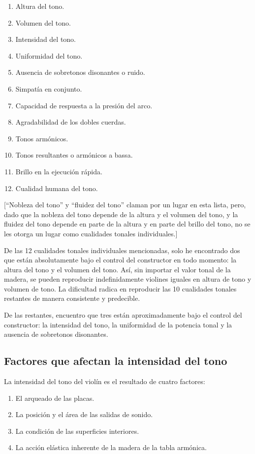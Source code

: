 \documentclass[12pt]{book}
\begin{document}
\begin{enumerate}
    \item Altura del tono.
    \item Volumen del tono.
    \item Intensidad del tono.
    \item Uniformidad del tono.
    \item Ausencia de sobretonos disonantes o ruido.
    \item Simpatía en conjunto.
    \item Capacidad de respuesta a la presión del arco.
    \item Agradabilidad de los dobles cuerdas.
    \item Tonos armónicos.
    \item Tonos resultantes o armónicos a bassa.
    \item Brillo en la ejecución rápida.
    \item Cualidad humana del tono.
\end{enumerate}

[``Nobleza del tono'' y ``fluidez del tono'' claman por un lugar en esta lista, pero, dado que la nobleza del tono depende de la altura y el volumen del tono, y la fluidez del tono depende en parte de la altura y en parte del brillo del tono, no se les otorga un lugar como cualidades tonales individuales.]

De las 12 cualidades tonales individuales mencionadas, solo he encontrado dos que están absolutamente bajo el control del constructor en todo momento: la altura del tono y el volumen del tono. Así, sin importar el valor tonal de la madera, se pueden reproducir indefinidamente violines iguales en altura de tono y volumen de tono. La dificultad radica en reproducir las 10 cualidades tonales restantes de manera consistente y predecible.

De las restantes, encuentro que tres están aproximadamente bajo el control del constructor: la intensidad del tono, la uniformidad de la potencia tonal y la ausencia de sobretonos disonantes.

\subsection*{Factores que afectan la intensidad del tono}

La intensidad del tono del violín es el resultado de cuatro factores:

\begin{enumerate}
    \item El arqueado de las placas.
    \item La posición y el área de las salidas de sonido.
    \item La condición de las superficies interiores.
    \item La acción elástica inherente de la madera de la tabla armónica.
\end{enumerate}
\end{document}
